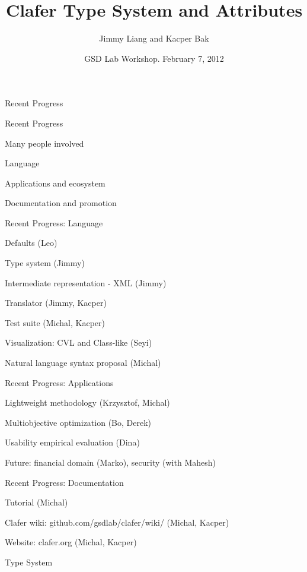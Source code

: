 \documentclass[table,15pt,t]{beamer}
\title{Clafer Type System and Attributes}
\author{Jimmy Liang and Kacper Bak}
\institute{\small Generative Software Development Lab\\University of Waterloo}
\date{GSD Lab Workshop. February 7, 2012}
\newcommand{\vmiddle}[1]{
  \vspace{\stretch{1}}
  #1
  \vspace{\stretch{1}}
}
\newcommand{\interframe}[1]{
\begin{frame}{}
\vmiddle{\hmiddle{\Huge #1}}
\end{frame}
}
\newcommand{\mlist}[1]{
\vmiddle{
  \begin{list}{}{}
    #1
  \end{list}
  }
}
\newcommand{\hmiddle}[1]{
  \begin{center}#1\end{center}
}
\begin{document}
\begin{frame}[plain]
  \vmiddle{\titlepage}
\end{frame}

\interframe{Recent Progress}

\begin{frame}{Recent Progress}
  \mlist{
  \item Many people involved
  \item Language
  \item Applications and ecosystem
  \item Documentation and promotion
  }
\end{frame}

\begin{frame}{Recent Progress: Language}
  \mlist{
  \item Defaults (Leo)
  \item Type system (Jimmy)
  \item Intermediate representation - XML (Jimmy)
  \item Translator (Jimmy, Kacper)
  \item Test suite (Michal, Kacper)
  \item Visualization: CVL and Class-like (Seyi)
  \item Natural language syntax proposal (Michal)
  }
\end{frame}

\begin{frame}{Recent Progress: Applications}
  \mlist{
  \item Lightweight methodology (Krzysztof, Michal)
  \item Multiobjective optimization (Bo, Derek)
  \item Usability empirical evaluation (Dina)
  \item Future: financial domain (Marko), security (with Mahesh)
  }
\end{frame}

\begin{frame}{Recent Progress: Documentation}
  \mlist{
  \item Tutorial (Michal)
  \item Clafer wiki: github.com/gsdlab/clafer/wiki/ (Michal, Kacper)
  \item Website: clafer.org (Michal, Kacper)
  }
\end{frame}

\interframe{Type System}
\end{document}
